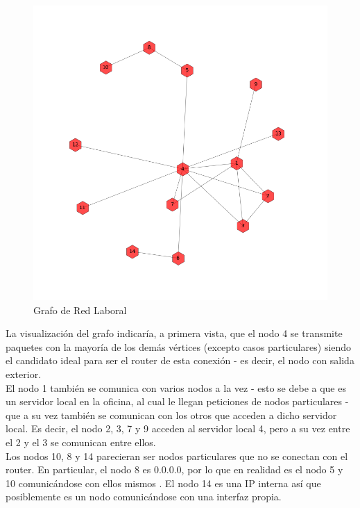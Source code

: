 \begin{figure}[h!]
    \centering                                                       
    \includegraphics[width=400pt]{img/laboralGraph.png}
    \caption{Grafo de Red Laboral}
    \label{laboralGraph}
\end{figure}

La visualizaci\'on del grafo indicar\'ia, a primera vista, que el nodo 4 se transmite paquetes con la mayor\'ia de los dem\'as v\'ertices (excepto casos particulares) siendo el candidato ideal para ser el router de esta conexi\'on - es decir, el nodo con salida exterior.\\

El nodo 1 tambi\'en se comunica con varios nodos a la vez - esto se debe a que es un servidor local en la oficina, al cual le llegan peticiones de nodos particulares - que a su vez tambi\'en se comunican con los otros que acceden a dicho servidor local. Es decir, el nodo 2, 3, 7 y 9 acceden al servidor local 4, pero a su vez entre el 2 y el 3 se comunican entre ellos.\\

Los nodos 10, 8 y 14 parecieran ser nodos particulares que no se conectan con el router. En particular, el nodo 8 es 0.0.0.0, por lo que en realidad es el nodo 5 y 10 comunic\'andose con ellos mismos . El nodo 14 es una IP interna as\'i que posiblemente es un nodo comunic\'andose con una interfaz propia.\\

